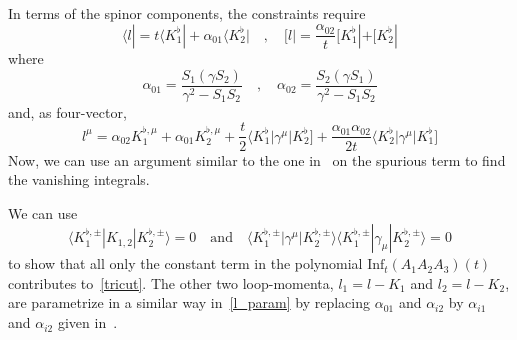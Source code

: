 In terms of the spinor components, the constraints require
\begin{equation}\label{l_param}
\langle l | = t\langle K_1^\flat| + \alpha_{01}\langle K_2^\flat| 
\quad,\quad
[ l | = \frac{\alpha_{02}}{t}[ K_1^\flat| + [ K_2^\flat|
\end{equation}
where
\begin{equation}
\alpha_{01} = \frac{S_1(\gamma S_2)}{\gamma^2 - S_1S_2}\quad,\quad
\alpha_{02} = \frac{S_2(\gamma S_1)}{\gamma^2 - S_1S_2}
\end{equation}
%
and, as four-vector,
\begin{equation}
l^\mu = \alpha_{02} K_1^{\flat,\mu} + \alpha_{01}K_2^{\flat,\mu} + \frac{t}{2}\langle K_1^\flat | \gamma^\mu |K_2^\flat] + \frac{\alpha_{01}\alpha_{02}}{2t}\langle K_2^\flat|\gamma^\mu |K_1^\flat]
\end{equation}
%
Now, we can use an argument similar to the one in~\cite{Ossola:2006us} on the spurious term to find the vanishing integrals.
%
\iffalse
To illustrate this argument, we consider the case of a rank-1 3-point-like integral. 
By simple arguments on the rank and the dependence on external momenta, 
\begin{equation}
\int\dd^D q \frac{q^\mu}{D_0(q)D_1(q+p_1)D_2(q+p_2)} = c_1p_1^\mu + c_2p_2^\mu
\end{equation}
If we contract the above relation with a vector $v^\mu$ orthogonal to $p_1$ and $p_2$, we obtain a vanishing integral.
$q\cdot v$ is hence a spurious term.
The same technique can be applied to show that $(q\cdot v)^n$ is spurious for any $n>0$. 
\fi
%
We can use 
\begin{equation}
\langle K_1^{\flat,\pm} | K_{1,2}|K_2^{\flat,\pm}\rangle = 0 
\quad\mathrm{and}\quad
\langle K_1^{\flat,\pm}|\gamma^\mu|K_{2}^{\flat,\pm}\rangle\langle K_1^{\flat,\pm}|\gamma_\mu|K_{2}^{\flat,\pm}\rangle = 0
\end{equation}
to show that all only the constant term in the polynomial $\mathrm{Inf}_t(A_1A_2A_3)(t)$ contributes to~\cref{tricut}. 
The other two loop-momenta, $l_1 = l-K_1$ and $l_2 = l-K_2$, are parametrize in a similar way in~\cref{l_param} by replacing $\alpha_{01}$ and $\alpha_{i2}$ by $\alpha_{i1}$ and $\alpha_{i2}$ given in~\cite{Forde:2007mi}.
%
%
